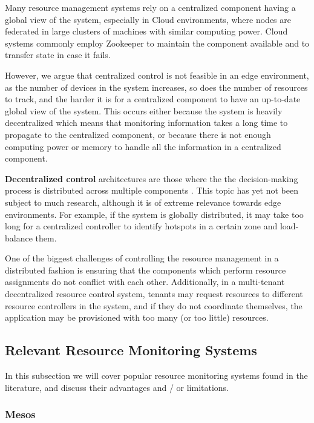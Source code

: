 Many resource management systems rely on a centralized component having a global view of the system, especially in Cloud environments, where nodes are federated in large clusters of machines with similar computing power. Cloud systems commonly employ Zookeeper \cite{hunt2010zookeeper} to maintain the component available and to transfer state in case it fails.

However, we argue that centralized control is not feasible in an edge environment, as the number of devices in the system increases, so does the number of resources to track, and the harder it is for a centralized component to have an up-to-date global view of the system. This occurs either because the system is heavily decentralized which means that monitoring information takes a long time to propagate to the centralized component, or because there is not enough computing power or memory to handle all the information in a centralized component.

\textbf{Decentralized control} architectures are those where the the decision-making process is distributed across multiple components \cite{Hong2019}. This topic has yet not been subject to much research, although it is of extreme relevance towards edge environments. For example, if the system is globally distributed, it may take too long for a centralized controller to identify hotspots in a certain zone and load-balance them.

One of the biggest challenges of controlling the resource management in a distributed fashion is ensuring that the components which perform resource assignments do not conflict with each other. Additionally, in a multi-tenant decentralized resource control system, tenants may request resources to different resource controllers in the system, and if they do not coordinate themselves, the application may be provisioned with too many (or too little) resources.

\subsection{Relevant Resource Monitoring Systems}

In this subsection we will cover popular resource monitoring systems found in the literature, and discuss their advantages and / or limitations.

\subsubsection{Mesos}

